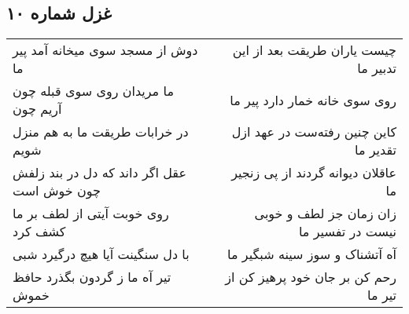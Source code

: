 \begin{center}
\section*{غزل شماره ۱۰}
\label{sec:sh010}
\begin{longtable}{l p{0.5cm} r}
دوش از مسجد سوی میخانه آمد پیر ما
&&
چیست یاران طریقت بعد از این تدبیر ما
\\
ما مریدان روی سوی قبله چون آریم چون
&&
روی سوی خانه خمار دارد پیر ما
\\
در خرابات طریقت ما به هم منزل شویم
&&
کاین چنین رفته‌ست در عهد ازل تقدیر ما
\\
عقل اگر داند که دل در بند زلفش چون خوش است
&&
عاقلان دیوانه گردند از پی زنجیر ما
\\
روی خوبت آیتی از لطف بر ما کشف کرد
&&
زان زمان جز لطف و خوبی نیست در تفسیر ما
\\
با دل سنگینت آیا هیچ درگیرد شبی
&&
آه آتشناک و سوز سینه شبگیر ما
\\
تیر آه ما ز گردون بگذرد حافظ خموش
&&
رحم کن بر جان خود پرهیز کن از تیر ما
\\
\end{longtable}
\end{center}
